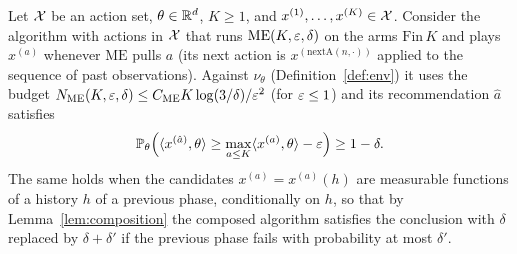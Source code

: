 \begin{corollary}\label{cor:median_elimination_linear}
\leanok
{}
Let $\mathcal{X}$ be an action set, $\theta\in\mathbb{R}^d$, $K\ge1$, and $x^{(1)},\dots,x^{(K)}\in\mathcal{X}$. Consider
the algorithm with actions in $\mathcal{X}$ that runs $\mathrm{ME}(K,\varepsilon,\delta)$ on the arms
$\mathrm{Fin}\,K$ and plays $x^{(a)}$ whenever $\mathrm{ME}$ pulls $a$ (its next action is
$x^{(\mathrm{nextA}(n,\cdot))}$ applied to the sequence of past observations). Against
$\nu_\theta$ (Definition~\ref{def:env}) it uses the budget $N_{\mathrm{ME}}(K,\varepsilon,\delta)\le C_{\mathrm{ME}}K\log(3/\delta)/\varepsilon^2$
(for $\varepsilon\le1$) and its recommendation $\hat a$ satisfies
\[
  \mathbb{P}_\theta\Big(\langle x^{(\hat a)}, \theta \rangle\ge\max_{a\le K}\langle x^{(a)}, \theta \rangle-\varepsilon\Big)\ge1-\delta .
\]
The same holds when the candidates $x^{(a)} = x^{(a)}(h)$ are measurable functions of a history $h$
of a previous phase, conditionally on $h$, so that by Lemma~\ref{lem:composition} the composed
algorithm satisfies the conclusion with $\delta$ replaced by $\delta+\delta'$ if the previous
phase fails with probability at most $\delta'$.
\end{corollary}

